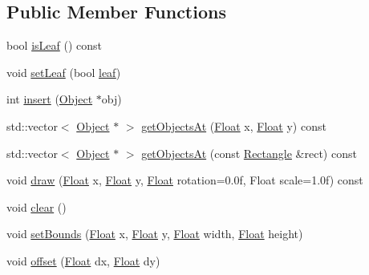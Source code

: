 \subsection*{Public Member Functions}
\begin{DoxyCompactItemize}
\item 
bool \hyperlink{classZeta_1_1StaticQuadtree_a2f9ecc36ae022da28b05c3df8d4bdfed}{is\+Leaf} () const 
\item 
void \hyperlink{classZeta_1_1StaticQuadtree_a2fa63262d64ac6a8544ce91cd0726344}{set\+Leaf} (bool \hyperlink{classZeta_1_1StaticQuadtree_a9a02ad0fad2aa38f649769dd371467d4}{leaf})
\item 
int \hyperlink{classZeta_1_1StaticQuadtree_a9e9baf436deb842b6f13140e6639bfdc}{insert} (\hyperlink{classZeta_1_1Object}{Object} $\ast$obj)
\item 
std\+::vector$<$ \hyperlink{classZeta_1_1Object}{Object} $\ast$ $>$ \hyperlink{classZeta_1_1StaticQuadtree_aff8dbd7a1c218eb78cd1b91fbd1626ca}{get\+Objects\+At} (\hyperlink{namespaceZeta_a1e0a1265f9b3bd3075fb0fabd39088ba}{Float} x, \hyperlink{namespaceZeta_a1e0a1265f9b3bd3075fb0fabd39088ba}{Float} y) const 
\item 
std\+::vector$<$ \hyperlink{classZeta_1_1Object}{Object} $\ast$ $>$ \hyperlink{classZeta_1_1StaticQuadtree_a2c3252569dd151af15204cca8dae523f}{get\+Objects\+At} (const \hyperlink{classZeta_1_1Rectangle}{Rectangle} \&rect) const 
\item 
void \hyperlink{classZeta_1_1StaticQuadtree_a24b8d0e8b3ccbfcffc65300e9ff1d860}{draw} (\hyperlink{namespaceZeta_a1e0a1265f9b3bd3075fb0fabd39088ba}{Float} x, \hyperlink{namespaceZeta_a1e0a1265f9b3bd3075fb0fabd39088ba}{Float} y, \hyperlink{namespaceZeta_a1e0a1265f9b3bd3075fb0fabd39088ba}{Float} rotation=0.\+0f, Float scale=1.\+0f) const 
\item 
void \hyperlink{classZeta_1_1StaticQuadtree_a7575ffa13b3f6fe929b781bdf328ae68}{clear} ()
\item 
void \hyperlink{classZeta_1_1StaticQuadtree_a6243625ecb8a71826f71a3b0652f694e}{set\+Bounds} (\hyperlink{namespaceZeta_a1e0a1265f9b3bd3075fb0fabd39088ba}{Float} x, \hyperlink{namespaceZeta_a1e0a1265f9b3bd3075fb0fabd39088ba}{Float} y, \hyperlink{namespaceZeta_a1e0a1265f9b3bd3075fb0fabd39088ba}{Float} width, \hyperlink{namespaceZeta_a1e0a1265f9b3bd3075fb0fabd39088ba}{Float} height)
\item 
void \hyperlink{classZeta_1_1StaticQuadtree_aa5f3fec20f813edd9586d7173bebbbcc}{offset} (\hyperlink{namespaceZeta_a1e0a1265f9b3bd3075fb0fabd39088ba}{Float} dx, \hyperlink{namespaceZeta_a1e0a1265f9b3bd3075fb0fabd39088ba}{Float} dy)

\end{DoxyCompactItemize}
